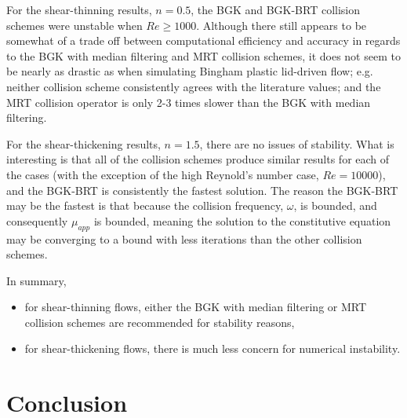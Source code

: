 \documentclass[pdftex,ms]{pittetd}
\begin{document}
For the shear-thinning results, $n = 0.5$, the BGK and BGK-BRT collision schemes were unstable when $Re \ge 1000$.
Although there still appears to be somewhat of a trade off between computational efficiency and accuracy in regards to the BGK with median filtering and MRT collision schemes, it does not seem to be nearly as drastic as when simulating Bingham plastic lid-driven flow; e.g. neither collision scheme consistently agrees with the literature values; and the MRT collision operator is only 2-3 times slower than the BGK with median filtering.

For the shear-thickening results, $n = 1.5$, there are no issues of stability.
What is interesting is that all of the collision schemes produce similar results for each of the cases (with the exception of the high Reynold's number case, $Re = 10000$), and the BGK-BRT is consistently the fastest solution.
The reason the BGK-BRT may be the fastest is that because the collision frequency, $\omega$, is bounded, and consequently $\mu_{app}$ is bounded, meaning the solution to the constitutive equation may be converging to a bound with less iterations than the other collision schemes.

In summary, 
\begin{itemize}
    \item for shear-thinning flows, either the BGK with median filtering or MRT collision schemes are recommended for stability reasons,
    \item for shear-thickening flows, there is much less concern for numerical instability.
\end{itemize}

\section{Conclusion}
\end{document}
